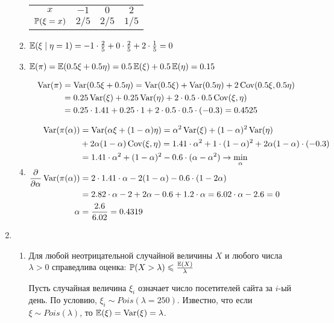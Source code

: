 \begin{enumerate}
\begin{enumerate}
\begin{center}
\begin{tabular}{cccc}
\toprule
$x$ & $-1$ & $0$ & $2$ \\
$\P(\xi = x)$ & $2/5$ & $2/5$ & $1/5$ \\ \bottomrule
\end{tabular}
\end{center}

\item $\E(\xi \mid \eta = 1) = -1 \cdot \frac{2}{5} + 0 \cdot \frac{2}{5} + 2 \cdot \frac{1}{5} = 0$
\item $\E(\pi) = \E(0.5 \xi + 0.5 \eta) = 0.5 \E(\xi) + 0.5 \E(\eta) = 0.15$

\begin{align*}
\Var(\pi) &= \Var(0.5 \xi + 0.5 \eta) = \Var(0.5 \xi) + \Var(0.5\eta) + 2 \Cov (0.5\xi, 0.5\eta) \\
&= 0.25\Var(\xi) + 0.25\Var(\eta) + 2 \cdot 0.5 \cdot 0.5 \Cov(\xi, \eta) \\
&= 0.25 \cdot 1.41 + 0.25 \cdot 1 + 2 \cdot 0.5 \cdot 0.5 \cdot (-0.3) = 0.4525
\end{align*}
\item
\begin{align*}
\Var(\pi(\alpha)) &= \Var(\alpha \xi + (1-\alpha)\eta) = \alpha^2\Var(\xi) + (1-\alpha)^2 \Var(\eta) \\
&+ 2\alpha(1-\alpha) \Cov(\xi, \eta) = 1.41 \cdot \alpha^2 + 1\cdot (1-\alpha)^2 + 2\alpha(1-\alpha) \cdot (-0.3) \\
&= 1.41 \cdot \alpha^2 + (1-\alpha)^2 - 0.6 \cdot (\alpha - \alpha^2) \to \min_\alpha \\
\frac{\partial}{\partial \alpha} \Var(\pi(\alpha)) &= 2 \cdot 1.41 \cdot \alpha -2(1-\alpha) -0.6\cdot(1-2\alpha) \\
&= 2.82 \cdot \alpha - 2 + 2\alpha - 0.6 + 1.2 \cdot \alpha = 6.02 \cdot \alpha - 2.6 = 0 \\
\alpha &= \frac{2.6}{6.02} = 0.4319
\end{align*}
\end{enumerate}
\item \begin{enumerate}
\item Для любой неотрицательной случайной величины $X$ и любого числа $\lambda > 0$ справедлива оценка: $\P(X>\lambda) \leq \frac{\E(X)}{\lambda}$

Пусть случайная величина $\xi_i$ означает число посетителей сайта за $i$-ый день. По условию, $\xi_i \sim Pois(\lambda=250)$. Известно, что если $\xi \sim Pois(\lambda)$, то $\E(\xi) = \Var(\xi) = \lambda$.


\end{enumerate}
\end{enumerate}
